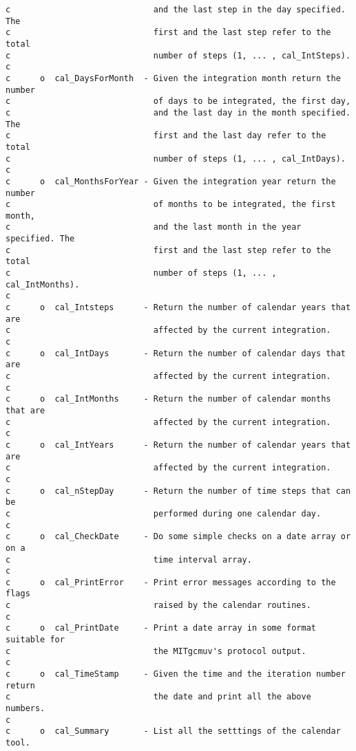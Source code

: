 {\begin{verbatim}
c                             and the last step in the day specified. The
c                             first and the last step refer to the total
c                             number of steps (1, ... , cal_IntSteps).
c
c      o  cal_DaysForMonth  - Given the integration month return the number
c                             of days to be integrated, the first day,
c                             and the last day in the month specified. The
c                             first and the last day refer to the total
c                             number of steps (1, ... , cal_IntDays).
c
c      o  cal_MonthsForYear - Given the integration year return the number
c                             of months to be integrated, the first month,
c                             and the last month in the year specified. The
c                             first and the last step refer to the total
c                             number of steps (1, ... , cal_IntMonths).
c
c      o  cal_Intsteps      - Return the number of calendar years that are
c                             affected by the current integration.
c
c      o  cal_IntDays       - Return the number of calendar days that are
c                             affected by the current integration.
c
c      o  cal_IntMonths     - Return the number of calendar months that are
c                             affected by the current integration.
c
c      o  cal_IntYears      - Return the number of calendar years that are
c                             affected by the current integration.
c
c      o  cal_nStepDay      - Return the number of time steps that can be
c                             performed during one calendar day.
c
c      o  cal_CheckDate     - Do some simple checks on a date array or on a
c                             time interval array.
c
c      o  cal_PrintError    - Print error messages according to the flags
c                             raised by the calendar routines.
c
c      o  cal_PrintDate     - Print a date array in some format suitable for
c                             the MITgcmuv's protocol output.
c
c      o  cal_TimeStamp     - Given the time and the iteration number return
c                             the date and print all the above numbers.
c
c      o  cal_Summary       - List all the setttings of the calendar tool.
\end{verbatim}
}

